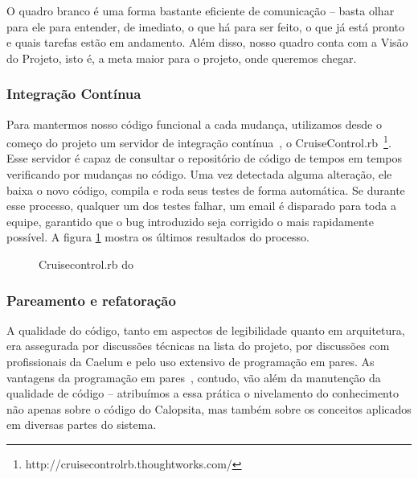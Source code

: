 O quadro branco é uma forma bastante eficiente de comunicação -- basta olhar para ele para entender, de imediato, o que há para ser feito, o que já está pronto e quais tarefas estão em andamento. Além disso, nosso quadro conta com a Visão do Projeto, isto é, a meta maior para o projeto, onde queremos chegar.

\subsubsection*{Integração Contínua}

Para mantermos nosso código funcional a cada mudança, utilizamos desde o começo do projeto um servidor de integração contínua~\cite{ci}, o CruiseControl.rb~\footnote{http://cruisecontrolrb.thoughtworks.com/}. Esse servidor é capaz de consultar o repositório de código de tempos em tempos verificando por mudanças no código. Uma vez detectada alguma alteração, ele baixa o novo código, compila e roda seus testes de forma automática. Se durante esse processo, qualquer um dos testes falhar, um email é disparado para toda a equipe, garantido que o bug introduzido seja corrigido o mais rapidamente possível. A figura \ref{figura:cruisecontrol} mostra os últimos resultados do processo.

\begin{figure}[H]
  \label{figura:cruisecontrol}
  \centering
  \caption{Cruisecontrol.rb do \calopsita}
\end{figure}

\subsubsection*{Pareamento e refatoração}

A qualidade do código, tanto em aspectos de legibilidade quanto em arquitetura, era assegurada por discussões técnicas na lista do projeto, por discussões com profissionais da Caelum e pelo uso extensivo de programação em pares. As vantagens da programação em pares~\cite{pair}, contudo, vão além da manutenção da qualidade de código -- atribuímos a essa prática o nivelamento do conhecimento não apenas sobre o código do Calopsita, mas também sobre os conceitos aplicados em diversas partes do sistema.

